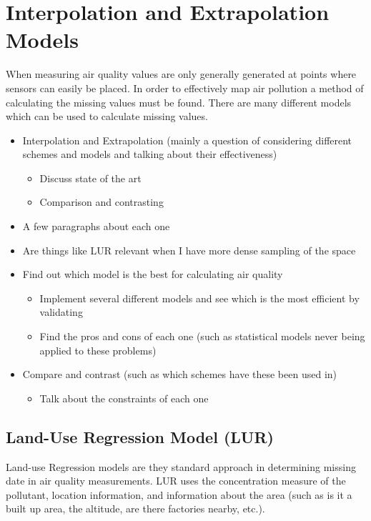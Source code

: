 \section{Interpolation and Extrapolation Models}\label{interpolation}


When measuring air quality values are only generally generated at points where sensors can easily be placed. In order to effectively map air pollution a method of calculating the missing values must be found. There are many different models which can be used to calculate missing values.


	\begin{itemize}
		\item Interpolation and Extrapolation (mainly a question of considering different schemes and models and talking about their effectiveness)
		\begin{itemize}
			\item Discuss state of the art
			\item Comparison and contrasting
		\end{itemize}
	    \item A few paragraphs about each one
	    \item Are things like LUR relevant when I have more dense sampling of the space
	    \item Find out which model is the best for calculating air quality
	    \begin{itemize}
	        \item Implement several different models and see which is the most efficient by validating
	        \item Find the pros and cons of each one (such as statistical models never being applied to these problems)
	    \end{itemize}
	    \item Compare and contrast (such as which schemes have these been used in)
	    \begin{itemize}
	        \item Talk about the constraints of each one
	    \end{itemize}
	\end{itemize}

\subsection{Land-Use Regression Model (LUR)}\label{lur}

Land-use Regression models are they standard approach in determining missing date in air quality measurements. LUR uses the concentration measure of the pollutant, location information, and information about the area (such as is it a built up area, the altitude, are there factories nearby, etc.). 






